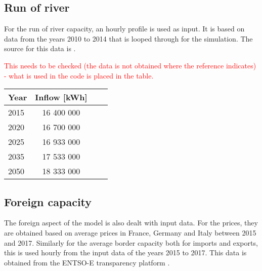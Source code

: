 
\subsection{Run of river}

For the run of river capacity, an hourly profile is used as input. It is based on data from the years 2010 to 2014 that is looped through for the simulation. The source for this data is \cite{demiray2018Modellierung}.

\textcolor{red}{This needs to be checked (the data is not obtained where the reference indicates) - what is used in the code is placed in the table.}

\begin{center}
\begin{tabular}{ |l|c|c|c| } 
\hline
Year		& Inflow [kWh]	\\ \hline \hline
2015		& 16 400 000	\\ \hline
2020		& 16 700 000	\\ \hline
2025		& 16 933 000	\\ \hline
2035		& 17 533 000	\\ \hline
2050		& 18 333 000	\\ \hline
\end{tabular}
\end{center}


\subsection{Foreign capacity}

The foreign aspect of the model is also dealt with input data. For the prices, they are obtained based on average prices in France, Germany and Italy between 2015 and 2017. Similarly for the average border capacity both for imports and exports, this is used hourly from the input data of the years 2015 to 2017. This data is obtained from the ENTSO-E transparency platform \citep{ENTSO2018transparency}.

